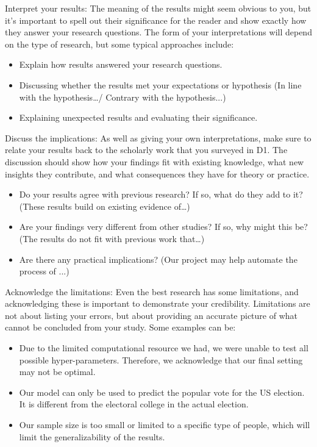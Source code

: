 \documentclass[letterpaper]{article} %
\begin{document}
Interpret your results: The meaning of the results might seem obvious to you, but it’s important to spell out their significance for the reader and show exactly how they answer your research questions. The form of your interpretations will depend on the type of research, but some typical approaches include:
\begin{itemize}
    \item Explain how results answered your research questions. 
    \item Discussing whether the results met your expectations or hypothesis (In line with the hypothesis…/ Contrary with the hypothesis...)
    \item Explaining unexpected results and evaluating their significance.
\end{itemize}

Discuss the implications: As well as giving your own interpretations, make sure to relate your results back to the scholarly work that you surveyed in D1. The discussion should show how your findings fit with existing knowledge, what new insights they contribute, and what consequences they have for theory or practice. 

\begin{itemize}
    \item Do your results agree with previous research? If so, what do they add to it? (These results build on existing evidence of…)
    \item Are your findings very different from other studies? If so, why might this be? (The results do not fit with previous work that…)
    \item Are there any practical implications? (Our project may help automate the process of ...)
\end{itemize}

Acknowledge the limitations: Even the best research has some limitations, and acknowledging these is important to demonstrate your credibility. Limitations are not about listing your errors, but about providing an accurate picture of what cannot be concluded from your study. Some examples can be:
\begin{itemize}
    \item Due to the limited computational resource we had, we were unable to test all possible hyper-parameters. Therefore, we acknowledge that our final setting may not be optimal.
    \item Our model can only be used to predict the popular vote for the US election. It is different from the electoral college in the actual election.
    \item Our sample size is too small or limited to a specific type of people, which will limit the generalizability of the results.
\end{itemize}
\end{document}
